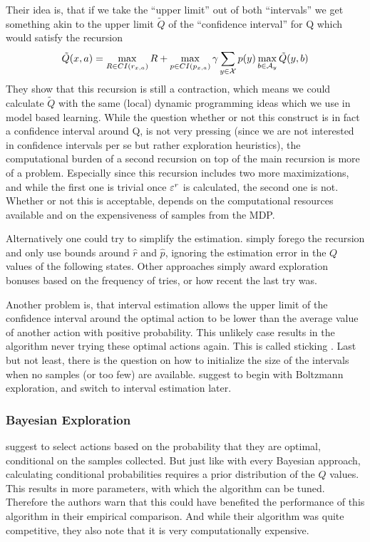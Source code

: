 Their idea is, that if we take the ``upper limit'' out of both ``intervals'' we get something akin to the upper limit \(\tilde{Q}\) of the ``confidence interval'' for Q which would satisfy the recursion
\[
	\tilde{Q}(x,a)=\max_{R\in CI(r_{x,a})} R 
	+\max_{p\in CI(p_{x,a})}\gamma\sum_{y\in\mathcal{X}}p(y) \max_{b\in\mathcal{A}_y}\tilde{Q}(y,b)
\]
They show that this recursion is still a contraction, which means we could calculate \(\tilde{Q}\) with the same (local) dynamic programming ideas which we use in model based learning. While the question whether or not this construct is in fact a confidence interval around Q, is not very pressing (since we are not interested in confidence intervals per se but rather exploration heuristics), the computational burden of a second recursion on top of the main recursion is more of a problem. Especially since this recursion includes two more maximizations, and while the first one is trivial once \(\varepsilon^r\) is calculated, the second one is not. Whether or not this is acceptable, depends on the computational resources available and on the expensiveness of samples from the MDP. 

Alternatively one could try to simplify the estimation. \textcite{wieringEfficientModelbasedExploration1998} simply forego the recursion and only use bounds around \(\hat{r}\) and \(\hat{p}\), ignoring the estimation error in the \(Q\) values of the following states. Other approaches simply award exploration bonuses based on the frequency of tries, or how recent the last try was.


Another problem is, that interval estimation allows the upper limit of the confidence interval around the optimal action to be lower than the average value of another action with positive probability. This unlikely case results in the algorithm never trying these optimal actions again. This is called sticking \parencite[61]{kaelblingLearningEmbeddedSystems1993}. Last but not least, there is the question on how to initialize the size of the intervals when no samples (or too few) are available. \textcite{wieringEfficientModelbasedExploration1998} suggest to begin with Boltzmann exploration, and switch to interval estimation later. 

\subsubsection{Bayesian Exploration}
\textcite{deardenBayesianQLearning1998} suggest to select actions based on the probability that they are optimal, conditional on the samples collected. But just like with every Bayesian approach, calculating conditional probabilities requires a prior distribution of the \(Q\) values. This results in more parameters, with which the algorithm can be tuned. Therefore the authors warn that this could have benefited the performance of this algorithm in their empirical comparison. And while their algorithm was quite competitive, they also note that it is very computationally expensive.


